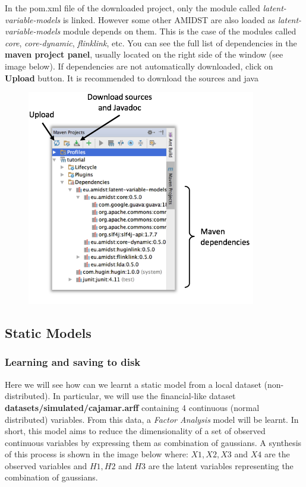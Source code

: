\documentclass[10pt,a4paper]{article}
\begin{document}
In the pom.xml file of the downloaded project, only the module called \textit{latent-variable-models} is linked. However some other AMIDST are also loaded as \textit{latent-variable-models} module depends on them. This is the case of the modules called \textit{core}, \textit{core-dynamic}, \textit{flinklink}, etc. You can see the full list of dependencies in the \textbf{maven project panel}, usually located on the right side of the window (see image below). If dependencies are not automatically downloaded, click on \textbf{Upload} button. It is recommended to download the sources and java 


\begin{figure}[h!]
	\centering
	\includegraphics[width=10cm]{img/mavenpanel.png}
	\label{fig:lvmodels:mavenpanel}	
\end{figure}

\newpage 
\subsection{Static Models}\label{sec:lvmodels:static}
\subsubsection{Learning and saving to disk}\label{sec:lvmodels:static:learning}


Here we will see how can we learnt a static model from a local dataset (non-distributed). In particular, we will use the financial-like dataset \textbf{datasets/simulated/cajamar.arff} containing 4 continuous (normal distributed) variables. From this data,  a \textit{Factor Analysis} model will be learnt. In short, this model aims to reduce the dimensionality of a set of observed continuous variables by expressing them as combination of gaussians. A synthesis of this process is shown in the image below where: $X1, X2, X3$ and $X4$ are the observed variables and $H1, H2$ and $H3$ are the latent variables representing the combination of gaussians.
\end{document}
